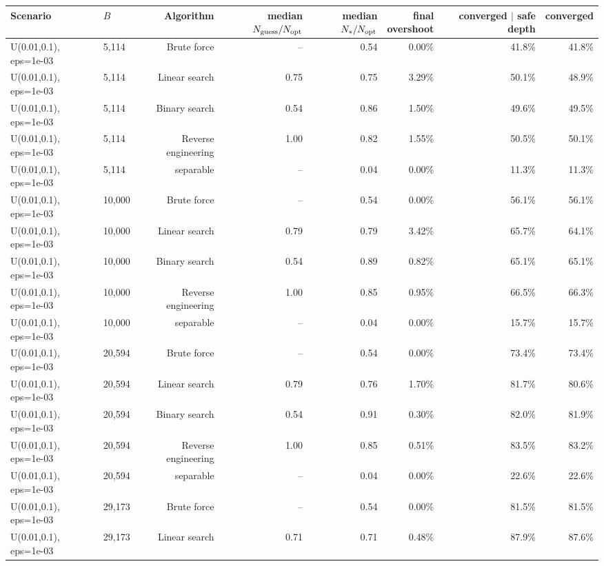\begin{tabular}{llrrrrrr}
\toprule
Scenario & $B$ & Algorithm & \makecell{median\\$N_{\rm guess}/N_{\rm opt}$} & \makecell{median\\$N_*/N_{\rm opt}$} & \makecell{final\\overshoot} & \makecell{converged\\$\mid$ safe depth} & converged \\
\midrule
U(0.01,0.1), eps=1e-03 & 5,114 & Brute force & -- & 0.54 & 0.00\% & 41.8\% & 41.8\% \\
U(0.01,0.1), eps=1e-03 & 5,114 & Linear search & 0.75 & 0.75 & 3.29\% & 50.1\% & 48.9\% \\
U(0.01,0.1), eps=1e-03 & 5,114 & Binary search & 0.54 & 0.86 & 1.50\% & 49.6\% & 49.5\% \\
U(0.01,0.1), eps=1e-03 & 5,114 & Reverse engineering & 1.00 & 0.82 & 1.55\% & 50.5\% & 50.1\% \\
U(0.01,0.1), eps=1e-03 & 5,114 & separable & -- & 0.04 & 0.00\% & 11.3\% & 11.3\% \\
U(0.01,0.1), eps=1e-03 & 10,000 & Brute force & -- & 0.54 & 0.00\% & 56.1\% & 56.1\% \\
U(0.01,0.1), eps=1e-03 & 10,000 & Linear search & 0.79 & 0.79 & 3.42\% & 65.7\% & 64.1\% \\
U(0.01,0.1), eps=1e-03 & 10,000 & Binary search & 0.54 & 0.89 & 0.82\% & 65.1\% & 65.1\% \\
U(0.01,0.1), eps=1e-03 & 10,000 & Reverse engineering & 1.00 & 0.85 & 0.95\% & 66.5\% & 66.3\% \\
U(0.01,0.1), eps=1e-03 & 10,000 & separable & -- & 0.04 & 0.00\% & 15.7\% & 15.7\% \\
U(0.01,0.1), eps=1e-03 & 20,594 & Brute force & -- & 0.54 & 0.00\% & 73.4\% & 73.4\% \\
U(0.01,0.1), eps=1e-03 & 20,594 & Linear search & 0.79 & 0.76 & 1.70\% & 81.7\% & 80.6\% \\
U(0.01,0.1), eps=1e-03 & 20,594 & Binary search & 0.54 & 0.91 & 0.30\% & 82.0\% & 81.9\% \\
U(0.01,0.1), eps=1e-03 & 20,594 & Reverse engineering & 1.00 & 0.85 & 0.51\% & 83.5\% & 83.2\% \\
U(0.01,0.1), eps=1e-03 & 20,594 & separable & -- & 0.04 & 0.00\% & 22.6\% & 22.6\% \\
U(0.01,0.1), eps=1e-03 & 29,173 & Brute force & -- & 0.54 & 0.00\% & 81.5\% & 81.5\% \\
U(0.01,0.1), eps=1e-03 & 29,173 & Linear search & 0.71 & 0.71 & 0.48\% & 87.9\% & 87.6\% \\

\end{tabular}
